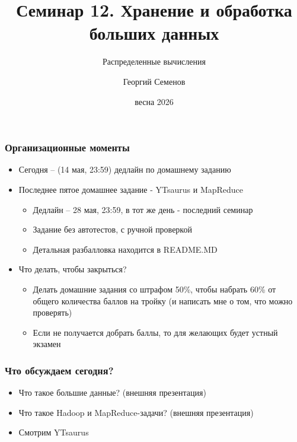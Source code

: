 \documentclass{beamer}
\title{Семинар 12. Хранение и обработка больших данных}
\subtitle{Распределенные вычисления}
\author{Георгий Семенов}
\institute{Институт прикладных компьютерных наук \\ Университет ИТМО}
\date{весна 2026}
\begin{document}
\frame{\titlepage}

\begin{frame}

\frametitle{Организационные моменты}

\begin{itemize}
  \item Сегодня – (14 мая, 23:59) дедлайн по домашнему заданию 
  \item Последнее пятое домашнее задание - YTsaurus и MapReduce
  \begin{itemize}
    \item Дедлайн – 28 мая, 23:59, в тот же день - последний семинар
    \item Задание без автотестов, с ручной проверкой
    \item Детальная разбалловка находится в README.MD
  \end{itemize}
  \item Что делать, чтобы закрыться?
  \begin{itemize}
    \item Делать домашние задания со штрафом 50\%, чтобы набрать 60\% от общего количества баллов на тройку (и написать мне о том, что можно проверять)
    \item Если не получается добрать баллы, то для желающих будет устный экзамен
  \end{itemize}
\end{itemize}

\end{frame}

\begin{frame}

\frametitle{Что обсуждаем сегодня?}

\begin{itemize}
  \item Что такое большие данные? (внешняя презентация)
  \item Что такое Hadoop и MapReduce-задачи? (внешняя презентация)
  \item Смотрим YTsaurus
\end{itemize}

\end{frame}


\end{document}
